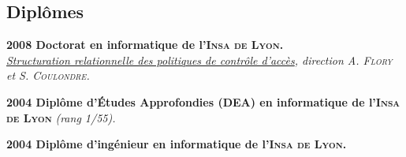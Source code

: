 \documentclass[12pt,a4paper]{article}
\newcommand{\activite}[1]{\textbf{#1}\xspace}
\newcommand{\comment}[1]{\textsl{#1}\xspace}
\newcommand{\INSAL}{\textsc{Insa de Lyon}\xspace}
\begin{document}
\subsection*{Diplômes}

    \activite{2008 Doctorat en informatique de l'\INSAL.}\\
    \comment{\href{https://www.theses.fr/131879375}{Structuration relationnelle des politiques de contrôle d'accès}, direction \textsc{A. Flory} et S. \textsc{Coulondre}.}

    \activite{2004 Diplôme d'Études Approfondies (DEA) en informatique de l'\INSAL}
    \comment{(rang 1\ier/55).}

    \activite{2004 Diplôme d'ingénieur en informatique de l'\INSAL.}
\end{document}
